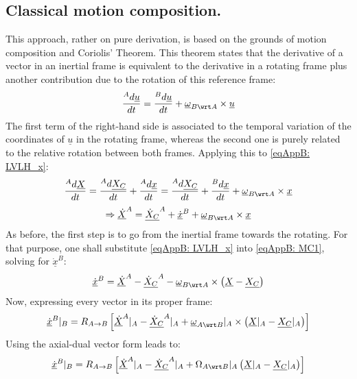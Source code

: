 	\subsection{Classical motion composition.}
	\indent This approach, rather on pure derivation, is based on the grounds of motion composition and Coriolis' Theorem. This theorem states that the derivative of a vector in an inertial frame is equivalent to the derivative in a rotating frame plus another contribution due to the rotation of this reference frame:
	\[
	\dfrac{^{A}d \underline{u}}{dt} = \dfrac{^{B}d \underline{u}}{dt} + \underline{\omega}_{B\wrt A} \times \underline{u}
	\]
	\indent The first term of the right-hand side is associated to the temporal variation of the coordinates of $\underline{u}$ in the rotating frame, whereas the second one is purely related to the relative rotation between both frames. Applying this to \ref{eqAppB: 	LVLH_x}:
	\[
	\dfrac{^{A}d \underline{X}}{dt} = \dfrac{^{A}d \underline{X_C}}{dt} + \dfrac{^{A}d \underline{x}}{dt} = \dfrac{^{A}d \underline{X_C}}{dt} + \dfrac{^{B}d \underline{x}}{dt} + \underline{\omega}_{B\wrt A} \times \underline{x}
	\]
	\begin{equation}
	\Rightarrow \underline{\dot{X}}^{A} = \underline{\dot{X}_C}^{A} + \underline{\dot{x}}^{B} + \underline{\omega}_{B\wrt A} \times \underline{x}
	\label{eqAppB: 	MC1}
	\end{equation}
	\indent As before, the first step is to go from the inertial frame towards the rotating. For that purpose, one shall substitute \eqref{eqAppB: 	LVLH_x} into \eqref{eqAppB: 	MC1}, solving for $\underline{\dot{x}}^{B}$:
	\begin{equation}
	\underline{\dot{x}}^{B} = \underline{\dot{X}}^{A} - \underline{\dot{X}_C}^{A} - \underline{\omega}_{B\wrt A} \times \left(\underline{X} - \underline{X_C} \right)
	\end{equation}
	\indent Now, expressing every vector in its proper frame:
	\begin{equation}
	\underline{\dot{x}}^{B}\rvert_{B} = R_{A\to B} \left[\underline{\dot{X}}^{A}\rvert_{A} - \underline{\dot{X}_C}^{A}\rvert_{A} + \underline{\omega}_{A\wrt B}\rvert_{A} \times \left(\underline{X}\rvert_{A} - \underline{X_C}\rvert_{A} \right)\right]
	\end{equation}
	\indent Using the axial-dual vector form leads to:
	\begin{equation}
	\underline{\dot{x}}^{B}\rvert_{B} = R_{A\to B} \left[\underline{\dot{X}}^{A}\rvert_{A} - \underline{\dot{X}_C}^{A}\rvert_{A} + \Omega_{A\wrt B}\rvert_{A} \left(\underline{X}\rvert_{A} - \underline{X_C}\rvert_{A} \right)\right]
	\end{equation}

